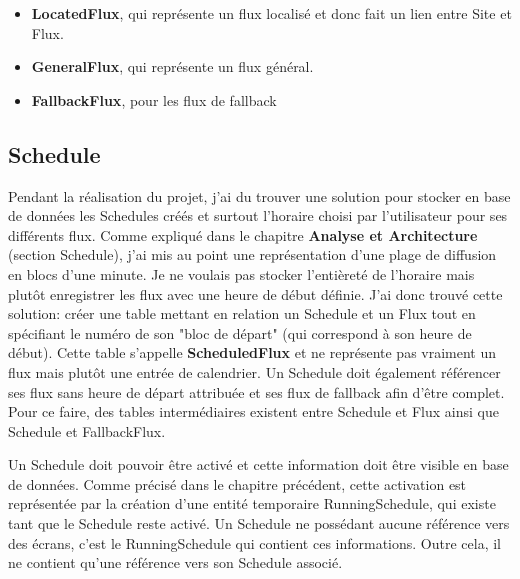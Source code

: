 \documentclass[french]{article}
\begin{document}
\begin{itemize}
	\item \textbf{LocatedFlux}, qui représente un flux localisé et donc fait un lien entre Site et Flux.
	\item \textbf{GeneralFlux}, qui représente un flux général.
	\item \textbf{FallbackFlux}, pour les flux de fallback
\end{itemize}

\subsection{Schedule}

Pendant la réalisation du projet, j'ai du trouver une solution pour stocker en base de données les Schedules créés et surtout l'horaire choisi par l'utilisateur pour ses différents flux. Comme expliqué dans le chapitre \textbf{Analyse et Architecture} (section Schedule), j'ai mis au point une représentation d'une plage de diffusion en blocs d'une minute. Je ne voulais pas stocker l'entièreté de l'horaire mais plutôt enregistrer les flux avec une heure de début définie. J'ai donc trouvé cette solution: créer une table mettant en relation un Schedule et un Flux tout en spécifiant le numéro de son "bloc de départ" (qui correspond à son heure de début). Cette table s'appelle \textbf{ScheduledFlux} et ne représente pas vraiment un flux mais plutôt une entrée de calendrier. \newline
Un Schedule doit également référencer ses flux sans heure de départ attribuée et ses flux de fallback afin d'être complet. Pour ce faire, des tables intermédiaires existent entre Schedule et Flux ainsi que Schedule et FallbackFlux.\newline

Un Schedule doit pouvoir être activé et cette information doit être visible en base de données. Comme précisé dans le chapitre précédent, cette activation est représentée par la création d'une entité temporaire RunningSchedule, qui existe tant que le Schedule reste activé. Un Schedule ne possédant aucune référence vers des écrans, c'est le RunningSchedule qui contient ces informations. Outre cela, il ne contient qu'une référence vers son Schedule associé. 
    
\end{document}
